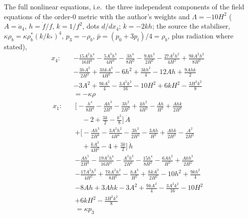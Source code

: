 \documentclass[
  10pt,
]{article}
\begin{document}
The full nonlinear equations, i.e.~the three independent components of
the field equations of the order-0 metric with the author's weights and
\(\Lambda = -10H^2\) (\(A = \dot a_4\), \(h = \dot f/f\), \(k = 1/f^2\),
dots \(d/dx_4\); \(\dot k = -2kh\); the source the stabiliser,
\(\kappa\rho_b = \kappa\rho_b^*(k/k_*)^4\), \(p_3 = -\rho_b\),
\(\bar p = (p_0 + 3p_t)/4 = \rho_b\), plus radiation where stated),
\[ \begin{aligned} x_4:\quad &- \frac{15 A^{2} h^{4}}{16 H^{4}} - \frac{5 A^{3} h^{3}}{4 H^{4}} - \frac{3 h^{4}}{8 H^{2}} - \frac{9 A h^{3}}{2 H^{2}} - \frac{27 A^{2} h^{2}}{4 H^{2}} + \frac{9 k A^{2} h^{2}}{8 H^{2}} \\
   &- \frac{3 h A^{3}}{2 H^{2}} + \frac{3 h k A^{3}}{4 H^{2}} - 6 h^{2} + \frac{3 k h^{2}}{4} - 12 A h + \frac{9 A h k}{2} \\
   &- 3 A^{2} + \frac{9 k A^{2}}{4} - \frac{3 A^{2} k^{2}}{16} - 10 H^{2} + 6 k H^{2} - \frac{3 H^{2} k^{2}}{8} \\
   &= -\kappa\rho \end{aligned} \]
\[ \begin{aligned} x_1:\quad &\Big[- \frac{h^{4}}{8 H^{4}} - \frac{A h^{3}}{2 H^{4}} - \frac{3 h^{2}}{2 H^{2}} + \frac{k h^{2}}{4 H^{2}} - \frac{A h}{H^{2}} + \frac{A h k}{2 H^{2}} \\
   &\quad -2 + \frac{3 k}{2} - \frac{k^{2}}{8}\Big]\,\dot A \\
   &+ \Big[- \frac{A h^{3}}{2 H^{4}} - \frac{3 A^{2} h^{2}}{4 H^{4}} - \frac{3 h^{2}}{2 H^{2}} - \frac{3 A h}{H^{2}} + \frac{A h k}{2 H^{2}} - \frac{A^{2}}{2 H^{2}} \\
   &\quad + \frac{k A^{2}}{4 H^{2}} - 4 + \frac{3 k}{2}\Big]\,\dot h \\
   &- \frac{A h^{5}}{2 H^{4}} - \frac{19 A^{2} h^{4}}{16 H^{4}} - \frac{A^{3} h^{3}}{2 H^{4}} - \frac{15 h^{4}}{8 H^{2}} - \frac{6 A h^{3}}{H^{2}} + \frac{A k h^{3}}{2 H^{2}} \\
   &- \frac{17 A^{2} h^{2}}{4 H^{2}} + \frac{7 k A^{2} h^{2}}{8 H^{2}} - \frac{h A^{3}}{H^{2}} + \frac{h k A^{3}}{2 H^{2}} - 10 h^{2} + \frac{9 k h^{2}}{4} \\
   &- 8 A h + 3 A h k - 3 A^{2} + \frac{9 k A^{2}}{4} - \frac{3 A^{2} k^{2}}{16} - 10 H^{2} \\
   &+ 6 k H^{2} - \frac{3 H^{2} k^{2}}{8} \\
   &= \kappa p_3 \end{aligned} \]
\end{document}
